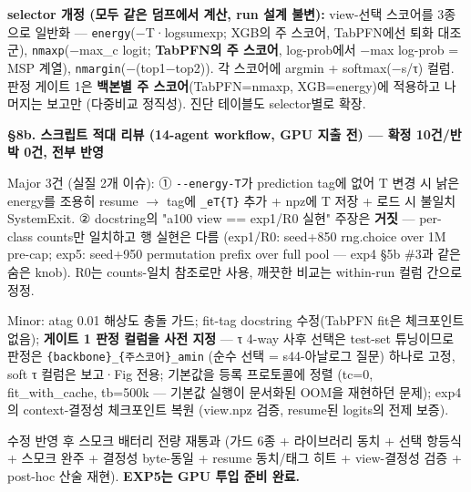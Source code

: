 \par\noindent \textbullet\enspace \textbf{selector 개정 (모두 같은 덤프에서 계산, run 설계 불변):} view-선택 스코어를 3종으로 일반화 — \texttt{energy}(−T·logsumexp; XGB의 주 스코어, TabPFN에선 퇴화 대조군), \texttt{nmaxp}(−max\_\allowbreak{}c logit; \textbf{TabPFN의 주 스코어}, log-prob에서 −max log-prob =\allowbreak{} MSP 계열), \texttt{nmargin}(−(top1−top2)). 각 스코어에 argmin +\allowbreak{} softmax(−s/\allowbreak{}τ) 컬럼. 판정 게이트 1은 \textbf{백본별 주 스코어}(TabPFN=\allowbreak{}nmaxp, XGB=\allowbreak{}energy)에 적용하고 나머지는 보고만 (다중비교 정직성). 진단 테이블도 selector별로 확장.


\textbf{§8b. 스크립트 적대 리뷰 (14-agent workflow, GPU 지출 전) — 확정 10건/\allowbreak{}반박 0건, 전부 반영}

Major 3건 (실질 2개 이슈): ① \texttt{-\allowbreak{}-\allowbreak{}energy\allowbreak{}-\allowbreak{}T}가 prediction tag에 없어 T 변경 시 낡은 energy를 조용히 resume  \ensuremath{\rightarrow}  tag에 \texttt{\_\allowbreak{}\allowbreak{}eT\{\allowbreak{}T\}\allowbreak{}} 추가 +\allowbreak{} npz에 T 저장 +\allowbreak{} 로드 시 불일치 SystemExit. ② docstring의 "a100 view =\allowbreak{}=\allowbreak{} exp1/\allowbreak{}R0 실현" 주장은 \textbf{거짓} — per-class counts만 일치하고 행 실현은 다름 (exp1/\allowbreak{}R0: seed+\allowbreak{}850 rng.choice over 1M pre-cap; exp5: seed+\allowbreak{}950 permutation prefix over full pool — exp4 §5b \#3과 같은 숨은 knob). R0는 counts-일치 참조로만 사용, 깨끗한 비교는 within-run 컬럼 간으로 정정.

Minor: atag 0.01 해상도 충돌 가드; fit-tag docstring 수정(TabPFN fit은 체크포인트 없음); \textbf{게이트 1 판정 컬럼을 사전 지정} — τ 4-way 사후 선택은 test-set 튜닝이므로 판정은 \texttt{\{\allowbreak{}backbon\allowbreak{}e\}\allowbreak{}\_\allowbreak{}\allowbreak{}\{\allowbreak{}주스코어\allowbreak{}\}\allowbreak{}\_\allowbreak{}\allowbreak{}amin} (순수 선택 =\allowbreak{} s44-아날로그 질문) 하나로 고정, soft τ 컬럼은 보고·Fig 전용; 기본값을 등록 프로토콜에 정렬 (tc=\allowbreak{}0, fit\_\allowbreak{}with\_\allowbreak{}cache, tb=\allowbreak{}500k — 기본값 실행이 문서화된 OOM을 재현하던 문제); exp4의 context-결정성 체크포인트 복원 (view.npz 검증, resume된 logits의 전제 보증).

수정 반영 후 스모크 배터리 전량 재통과 (가드 6종 +\allowbreak{} 라이브러리 동치 +\allowbreak{} 선택 항등식 +\allowbreak{} 스모크 완주 +\allowbreak{} 결정성 byte-동일 +\allowbreak{} resume 동치/\allowbreak{}태그 히트 +\allowbreak{} view-결정성 검증 +\allowbreak{} post-hoc 산술 재현). \textbf{EXP5는 GPU 투입 준비 완료.}

